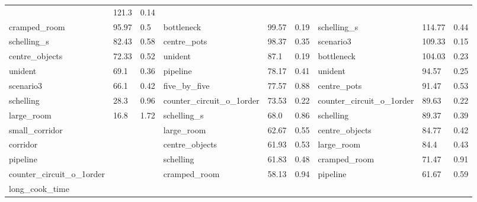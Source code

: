 \begin{table}[t]
\begin{center}
\begin{tabular}{lll|lll|lll}
           &  121.3
           &  0.14
\\
        cramped\_room
           &  95.97
           &  0.5
&
        bottleneck
           &  99.57
           &  0.19
&
        schelling\_s
           &  114.77
           &  0.44
\\
        schelling\_s
           &  82.43
           &  0.58
&
        centre\_pots
           &  98.37
           &  0.35
&
        scenario3
           &  109.33
           &  0.15
\\
        centre\_objects
           &  72.33
           &  0.52
&
        unident
           &  87.1
           &  0.19
&
        bottleneck
           &  104.03
           &  0.23
\\
        unident
           &  69.1
           &  0.36
&
        pipeline
           &  78.17
           &  0.41
&
        unident
           &  94.57
           &  0.25
\\
        scenario3
           &  66.1
           &  0.42
&
        five\_by\_five
           &  77.57
           &  0.88
&
        centre\_pots
           &  91.47
           &  0.53
\\
        schelling
           &  28.3
           &  0.96
&
        counter\_circuit\_o\_1order
           &  73.53
           &  0.22
&
        counter\_circuit\_o\_1order
           &  89.63
           &  0.22
\\
        large\_room
           &  16.8
           &  1.72
&
        schelling\_s
           &  68.0
           &  0.86
&
        schelling
           &  89.37
           &  0.39
\\
        small\_corridor
           &  
           &  
&
        large\_room
           &  62.67
           &  0.55
&
        centre\_objects
           &  84.77
           &  0.42
\\
        corridor
           &  
           &  
&
        centre\_objects
           &  61.93
           &  0.53
&
        large\_room
           &  84.4
           &  0.43
\\
        pipeline
           &  
           &  
&
        schelling
           &  61.83
           &  0.48
&
        cramped\_room
           &  71.47
           &  0.91
\\
        counter\_circuit\_o\_1order
           &  
           &  
&
        cramped\_room
           &  58.13
           &  0.94
&
        pipeline
           &  61.67
           &  0.59
\\
        long\_cook\_time
           &  
           &  

\end{tabular}
\end{center}
\end{table}

